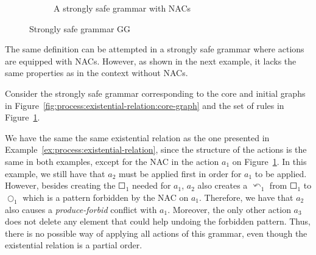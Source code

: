 \begin{example}
\begin{figure}[!ht]
\begin{subfigure}[t]{.5\textwidth}
    \caption{A strongly safe grammar with NACs}\label{fig:process:existential-relation:example-nacs}
  \end{subfigure}
  \caption{Strongly safe grammar GG}\label{fig:process:existential-relation}
\end{figure}
\end{example}

The same definition can be attempted in a strongly safe grammar where actions are equipped with NACs. However, as shown in the next example, it lacks the same properties as in the context without NACs.

\begin{example}\label{ex:process:existential-relation-fail}Consider the strongly safe grammar corresponding to the core and initial graphs in Figure~\ref{fig:process:existential-relation:core-graph} and the set of rules in Figure~\ref{fig:process:existential-relation:example-nacs}. 

  We have the same the same existential relation as the one presented in Example~\ref{ex:process:existential-relation}, since the structure of the actions is the same in both examples, except for the NAC in the action $a_1$ on Figure~\ref{fig:process:existential-relation:example-nacs}. In this example, we still have that $a_2$ must be applied first in order for $a_1$ to be applied. However, besides creating the $\Square_1$ needed for $a_1$, $a_2$ also creates a $\curvearrowleft_1$ from $\Square_1$ to $\Circle_1$ which is a pattern forbidden by the NAC on $a_1$. Therefore, we have that $a_2$ also causes a \emph{produce-forbid} conflict with $a_1$. Moreover, the only other action $a_3$ does not delete any element that could help undoing the forbidden pattern. Thus, there is no possible way of applying all actions of this grammar, even though the existential relation is a partial order.

\end{example}

